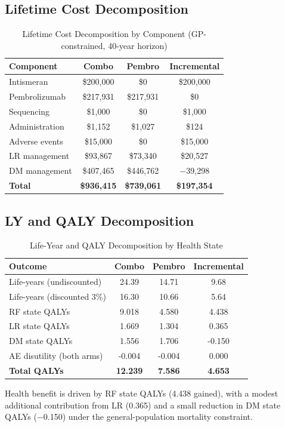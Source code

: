 \documentclass[11pt,a4paper]{article}
\begin{document}
\subsection{Lifetime Cost Decomposition}
\label{sec:cost_decomp}
\begin{table}[H]
\centering
\caption{Lifetime Cost Decomposition by Component (GP-constrained, 40-year horizon)}
\label{tab:s9}
\begin{tabular}{lccc}
\toprule
\textbf{Component} & \textbf{Combo} & \textbf{Pembro} & \textbf{Incremental} \\
\midrule
Intismeran & \$200,000 & \$0 & \$200,000 \\
Pembrolizumab & \$217,931 & \$217,931 & \$0 \\
Sequencing & \$1,000 & \$0 & \$1,000 \\
Administration & \$1,152 & \$1,027 & \$124 \\
Adverse events & \$15,000 & \$0 & \$15,000 \\
LR management & \$93,867 & \$73,340 & \$20,527 \\
DM management & \$407,465 & \$446,762 & $-$39,298 \\
\midrule
\textbf{Total} & \textbf{\$936,415} & \textbf{\$739,061} & \textbf{\$197,354} \\
\bottomrule
\end{tabular}
\end{table}

\subsection{LY and QALY Decomposition}
\label{sec:qaly_decomp}
\begin{table}[H]
\centering
\caption{Life-Year and QALY Decomposition by Health State}
\label{tab:s10}
\begin{tabular}{lccc}
\toprule
\textbf{Outcome} & \textbf{Combo} & \textbf{Pembro} & \textbf{Incremental} \\
\midrule
Life-years (undiscounted) & 24.39 & 14.71 & 9.68 \\
Life-years (discounted 3\%) & 16.30 & 10.66 & 5.64 \\
\midrule
RF state QALYs & 9.018 & 4.580 & 4.438 \\
LR state QALYs & 1.669 & 1.304 & 0.365 \\
DM state QALYs & 1.556 & 1.706 & -0.150 \\
AE disutility (both arms) & -0.004 & -0.004 & 0.000 \\
\midrule
\textbf{Total QALYs} & \textbf{12.239} & \textbf{7.586} & \textbf{4.653} \\
\bottomrule
\end{tabular}
\end{table}
Health benefit is driven by RF state QALYs (4.438 gained), with a modest additional contribution from LR (0.365) and a small reduction in DM state QALYs ($-$0.150) under the general-population mortality constraint.
\end{document}
